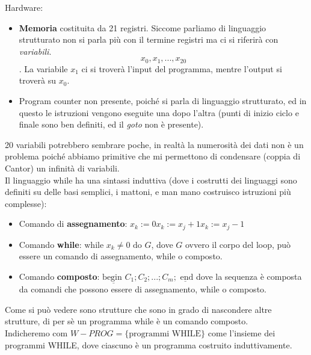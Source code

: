\documentclass{article}
\begin{document}
Hardware:
\begin{itemize}
    \item \textbf{Memoria} costituita da 21 registri. Siccome parliamo di linguaggio strutturato
          non si parla più con il termine registri ma ci si riferirà con \textit{variabili}.
          $$x_0,x_1,...,x_{20}$$. La variabile $x_1$ ci si troverà l'input del programma, mentre
          l'output si troverà su $x_0$.
    \item Program counter non presente, poiché si parla di linguaggio strutturato, ed in questo
          le istruzioni vengono eseguite una dopo l'altra (punti di inizio ciclo e finale
          sono ben definiti, ed il \textit{goto} non è presente).
\end{itemize}
20 variabili potrebbero sembrare poche, in realtà la numerosità dei dati non è un problema
poiché abbiamo primitive che mi permettono di condensare (coppia di Cantor) un infinità
di variabili.\\Il linguaggio while ha una sintassi induttiva (dove i costrutti dei linguaggi
sono definiti su delle basi semplici, i mattoni, e man mano costruisco istruzioni più
complesse):
\begin{itemize}
    \item Comando di \textbf{assegnamento}: $x_k:=0 x_k:=x_j+1 x_k:=x_j-1$
    \item Comando \textbf{while}: $\text{while }x_k\neq 0\text{ do } G$, dove $G$
          ovvero il corpo del loop, può essere un comando di assegnamento, while o composto.
    \item Comando \textbf{composto}: $\underline{\text{begin }}C_1; C_2; ...;C_m;
              \underline{\text{ end}}$ dove la sequenza è composta da comandi che possono essere
          di assegnamento, while o composto.
\end{itemize}
Come si può vedere sono strutture che sono in grado di nascondere altre strutture, di per sè
un programma while è un comando composto.\\Indicheremo com $W-PROG=\{\text{programmi WHILE}\}$
come l'insieme dei programmi WHILE, dove ciascuno è un programma costruito induttivamente.
\end{document}
